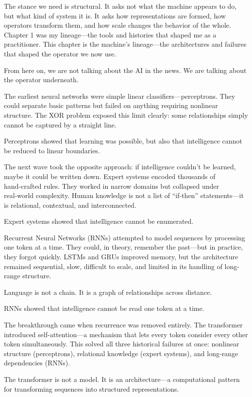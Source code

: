\documentclass[
]{article}
\begin{document}
The stance we need is structural. It asks not what the machine appears
to do, but what kind of system it is. It asks how representations are
formed, how operators transform them, and how scale changes the behavior
of the whole. Chapter 1 was my lineage---the tools and histories that
shaped me as a practitioner. This chapter is the machine's lineage---the
architectures and failures that shaped the operator we now use.

From here on, we are not talking about the AI in the news. We are
talking about the operator underneath.

The earliest neural networks were simple linear
classifiers---perceptrons. They could separate basic patterns but failed
on anything requiring nonlinear structure. The XOR problem exposed this
limit clearly: some relationships simply cannot be captured by a
straight line.

Perceptrons showed that learning was possible, but also that
intelligence cannot be reduced to linear boundaries.

The next wave took the opposite approach: if intelligence couldn't be
learned, maybe it could be written down. Expert systems encoded
thousands of hand‑crafted rules. They worked in narrow domains but
collapsed under real‑world complexity. Human knowledge is not a list of
``if‑then'' statements---it is relational, contextual, and
interconnected.

Expert systems showed that intelligence cannot be enumerated.

Recurrent Neural Networks (RNNs) attempted to model sequences by
processing one token at a time. They could, in theory, remember the
past---but in practice, they forgot quickly. LSTMs and GRUs improved
memory, but the architecture remained sequential, slow, difficult to
scale, and limited in its handling of long-range structure.

Language is not a chain. It is a graph of relationships across distance.

RNNs showed that intelligence cannot be read one token at a time.

The breakthrough came when recurrence was removed entirely. The
transformer introduced self‑attention---a mechanism that lets every
token consider every other token simultaneously. This solved all three
historical failures at once: nonlinear structure (perceptrons),
relational knowledge (expert systems), and long‑range dependencies
(RNNs).

The transformer is not a model. It is an architecture---a computational
pattern for transforming sequences into structured representations.
\end{document}
